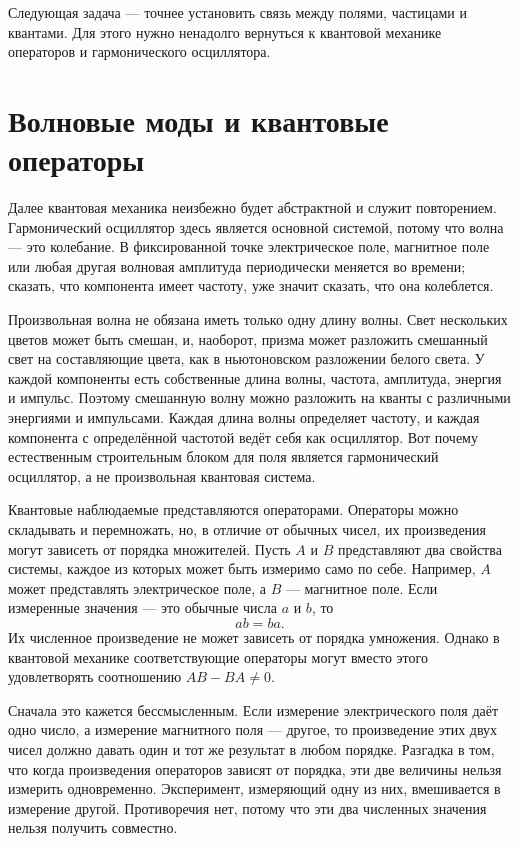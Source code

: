 Следующая задача — точнее установить связь между полями, частицами и квантами. Для этого нужно ненадолго вернуться к квантовой механике операторов и гармонического осциллятора.

\section{Волновые моды и квантовые операторы}

Далее квантовая механика неизбежно будет абстрактной и служит повторением. Гармонический осциллятор здесь является основной системой, потому что волна — это колебание. В фиксированной точке электрическое поле, магнитное поле или любая другая волновая амплитуда периодически меняется во времени; сказать, что компонента имеет частоту, уже значит сказать, что она колеблется.

Произвольная волна не обязана иметь только одну длину волны. Свет нескольких цветов может быть смешан, и, наоборот, призма может разложить смешанный свет на составляющие цвета, как в ньютоновском разложении белого света. У каждой компоненты есть собственные длина волны, частота, амплитуда, энергия и импульс. Поэтому смешанную волну можно разложить на кванты с различными энергиями и импульсами. Каждая длина волны определяет частоту, и каждая компонента с определённой частотой ведёт себя как осциллятор. Вот почему естественным строительным блоком для поля является гармонический осциллятор, а не произвольная квантовая система.

Квантовые наблюдаемые представляются операторами. Операторы можно складывать и перемножать, но, в отличие от обычных чисел, их произведения могут зависеть от порядка множителей. Пусть \(A\) и \(B\) представляют два свойства системы, каждое из которых может быть измеримо само по себе. Например, \(A\) может представлять электрическое поле, а \(B\) — магнитное поле. Если измеренные значения — это обычные числа \(a\) и \(b\), то
\begin{equation}
ab=ba.
\end{equation}
Их численное произведение не может зависеть от порядка умножения. Однако в квантовой механике соответствующие операторы могут вместо этого удовлетворять соотношению \(AB-BA\neq0\).

Сначала это кажется бессмысленным. Если измерение электрического поля даёт одно число, а измерение магнитного поля — другое, то произведение этих двух чисел должно давать один и тот же результат в любом порядке. Разгадка в том, что когда произведения операторов зависят от порядка, эти две величины нельзя измерить одновременно. Эксперимент, измеряющий одну из них, вмешивается в измерение другой. Противоречия нет, потому что эти два численных значения нельзя получить совместно.


